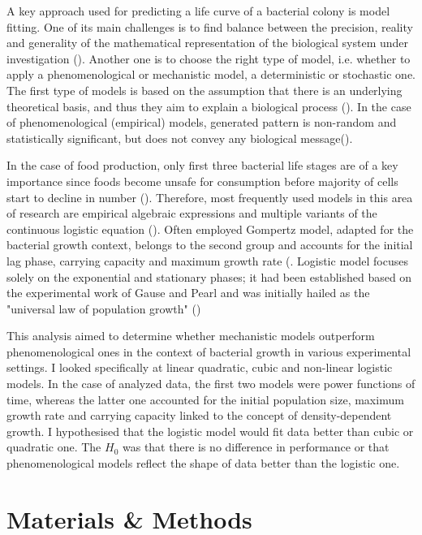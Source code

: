 \documentclass[a4paper,11pt]{article}
\begin{document}
A key approach used for predicting a life curve of a bacterial colony is model fitting. One of its main challenges is to find balance between the precision, reality and generality of the mathematical representation of the biological system under investigation (\cite{levins1966strategy}). Another one is to choose the right type of model, i.e. whether to apply a phenomenological or mechanistic model, a deterministic or stochastic one. The first type of models is based on the assumption that there is an underlying theoretical basis, and thus they aim to explain a biological process (\cite{peleg2011microbial}). In the case of phenomenological (empirical) models, generated pattern is non-random and statistically significant, but does not convey any biological message(\cite{peleg2011microbial}).\par

In the case of food production, only first three bacterial life stages are of a key importance since foods become unsafe for consumption before majority of cells start to decline in number (\cite{peleg2011microbial}). Therefore, most frequently used models in this area of research are empirical algebraic expressions and multiple variants of the continuous logistic equation (\cite{peleg2011microbial}). Often employed Gompertz model, adapted for the bacterial growth context, belongs to the second group and accounts for the initial lag phase, carrying capacity and maximum growth rate (\cite{buchanan1997simple}. Logistic model focuses solely on the exponential and stationary phases; it had been established based on the experimental work of Gause and Pearl and was initially hailed as the "universal law of population growth" (\cite{krebs1985ecology})\par

This analysis aimed to determine whether mechanistic models outperform phenomenological ones in the context of bacterial growth in various experimental settings. I looked specifically at linear quadratic, cubic and non-linear logistic models. In the case of analyzed data, the first two models were power functions of time, whereas the latter one accounted for the initial population size, maximum growth rate and carrying capacity linked to the concept of density-dependent growth. I hypothesised that the logistic model would fit data better than cubic or quadratic one. The $H_{0}$ was that there is no difference in performance or that phenomenological models reflect the shape of data better than the logistic one.

    \section{Materials \& Methods}
    
\end{document}
